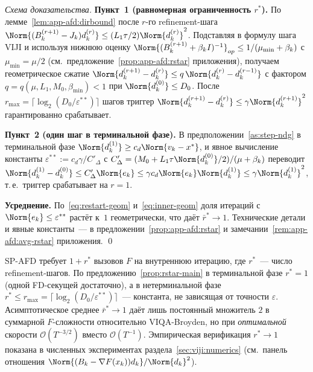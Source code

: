 \begin{proof}[Схема доказательства]
\textbf{Пункт~1 (равномерная ограниченность $r^{*}$).}
По лемме~\ref{lem:app-afd:dirbound} после $r$-го refinement-шага
$\Norm{(B_k^{(r+1)} - J_k)d^{(r)}_k} \le (L_1\tau/2)\Norm{d^{(r)}_k}^2$.
Подставляя в формулу шага VIJI и используя нижнюю оценку
$\Norm{(B_k^{(r+1)} + \beta_k I)^{-1}}_{op} \le 1/(\mu_{\min} + \beta_k)$
с $\mu_{\min} = \mu/2$ (см.\ предложение~\ref{prop:app-afd:rstar}
приложения), получаем геометрическое сжатие
$\Norm{d^{(r+1)}_k - d^{(r)}_k} \le q\,\Norm{d^{(r)}_k - d^{(r-1)}_k}$
с фактором $q = q(\mu, L_1, M_0, \beta_{\min}) < 1$ при
$\Norm{d^{(0)}_k} \le D_0$. После $r_{\max} = \lceil\log_2(D_0/\varepsilon^{**})\rceil$
шагов триггер $\Norm{d^{(r+1)}_k - d^{(r)}_k} \le \gamma\Norm{d^{(r+1)}_k}^2$
гарантированно срабатывает.

\textbf{Пункт~2 (один шаг в терминальной фазе).}
В предположении~\ref{as:step-ndg} в терминальной фазе $\Norm{d^{(1)}_k}
\ge c_d \Norm{v_k - x^{*}}$, и явное вычисление константы
$\varepsilon^{**} := c_d\gamma/C'_{\Delta}$ с
$C'_{\Delta} = (M_0 + L_1\tau \Norm{d^{(0)}_k}/2)/(\mu + \beta_k)$
переводит $\Norm{d^{(1)}_k - d^{(0)}_k} \le C'_{\Delta}\Norm{e_k} \le
\gamma c_d \Norm{e_k}\Norm{d^{(1)}_k} \le \gamma\Norm{d^{(1)}_k}^2$,
т.\,е.\ триггер срабатывает на $r = 1$.

\textbf{Усреднение.}
По~\eqref{eq:restart-geom} и~\eqref{eq:inner-geom} доля итераций с
$\Norm{e_k} \le \varepsilon^{**}$ растёт к~$1$ геометрически, что даёт
$\bar r^{*} \to 1$. Технические детали и явные константы~--- в
предложении~\ref{prop:app-afd:rstar} и
замечании~\ref{rem:app-afd:avg-rstar} приложения. \qed
\end{proof}

\begin{remark}
\label{rem:cost}
SP-AFD требует $1 + r^{*}$ вызовов $F$ на внутреннюю итерацию, где
$r^{*}$~--- число refinement-шагов. По
предложению~\ref{prop:rstar-main} в терминальной фазе $r^{*} = 1$
(одной FD-секущей достаточно), а в нетерминальной фазе $r^{*} \le
r_{\max} = \lceil\log_2(D_0/\varepsilon^{**})\rceil$~---
константа, не зависящая от точности $\varepsilon$. Асимптотическое
среднее $\bar r^{*} \to 1$ даёт лишь постоянный множитель $2$ в
суммарной $F$-сложности относительно VIQA-Broyden, но при
\emph{оптимальной} скорости $\mathcal O(T^{-3/2})$ вместо
$\mathcal O(T^{-1})$. Эмпирическая верификация $r^{*} \to 1$
показана в численных экспериментах раздела~\ref{sec:viji:numerics}
(см.\ панель отношения $\Norm{(B_k - \nabla F(x_k))d_k}/\Norm{d_k}^2$).
\end{remark}

